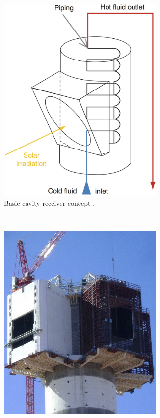 \begin{figure}[!htbp]
        \centering
        \begin{subfigure}[b]{0.5\textwidth}
                \centering
                \includegraphics[width=0.9\textwidth]{FIG/CavityReceiver}
                \caption{Basic cavity receiver concept \cite{Alexopoulos2013}.}\label{CavityReceiver}
        \end{subfigure}%
        ~
        \begin{subfigure}[b]{0.5\textwidth}
                \centering
                \includegraphics[width=0.9\textwidth]{FIG/KhiSolarOneReceiver}

\end{subfigure}
\end{figure}
